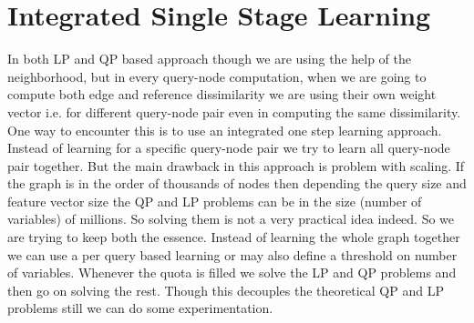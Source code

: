 \section*{Integrated Single Stage Learning}
In both LP and QP based approach though we are using the help of the neighborhood, but in every query-node computation, when we are going to compute both edge and reference dissimilarity we are using their own weight vector i.e. for different query-node pair even in computing the same dissimilarity. One way to encounter this is to use an integrated one step learning approach. Instead of learning for a specific query-node pair we try to learn all query-node pair together. But the main drawback in this approach is problem with scaling. If the graph is in the order of thousands of nodes then depending the query size and feature vector size the QP and LP problems can be in the size (number of variables) of millions. So solving them is not a very practical idea indeed. So we are trying to keep both the essence. Instead of learning the whole graph together we can use a per query based learning or may also define a threshold on number of variables. Whenever the quota is filled we solve the LP and QP problems and then go on solving the rest. Though this decouples the theoretical QP and LP problems still we can do some experimentation.

